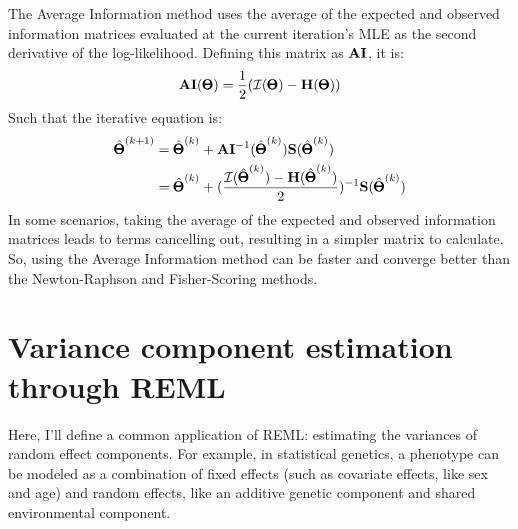 \documentclass[12pt]{article}
\begin{document}
The Average Information method uses the average of the expected and observed information matrices evaluated at the current iteration's MLE as the second derivative of the log-likelihood. Defining this matrix as $\mathbf{AI}$, it is:
$$
\mathbf{AI}(\pmb{\Theta}) = \frac{1}{2}
(\mathcal{I}(\pmb{\Theta}) - \mathbf{H}(\pmb{\Theta}))  
$$
Such that the iterative equation is:
\begin{align*}
\hat{\pmb{\Theta}}^{(k+1)} &= 
\hat{\pmb{\Theta}}^{(k)} +
\mathbf{AI}^{-1} (\hat{\pmb{\Theta}}^{(k)})
\mathbf{S}(\hat{\pmb{\Theta}}^{(k)}) \\
&= 
\hat{\pmb{\Theta}}^{(k)} +
(\frac{\mathcal{I}(\hat{\pmb{\Theta}}^{(k)}) -
\mathbf{H}(\hat{\pmb{\Theta}}^{(k)})}{2})^{-1}
\mathbf{S}(\hat{\pmb{\Theta}}^{(k)})
\end{align*}
In some scenarios, taking the average of the expected and observed information matrices leads to terms cancelling out, resulting in a simpler matrix to calculate.
So, using the Average Information method can be faster and converge better than the Newton-Raphson and Fisher-Scoring methods.

\section{Variance component estimation through REML}
Here, I'll define a common application of REML: estimating the variances of random effect components.
For example, in statistical genetics, a phenotype can be modeled as a combination of fixed effects (such as covariate effects, like sex and age) and random effects, like an additive genetic component and shared environmental component.
\end{document}
